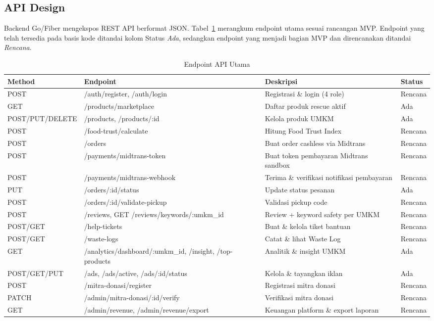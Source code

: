 \subsection{API Design}

Backend Go/Fiber mengekspos REST API berformat JSON. Tabel~\ref{tab:api} merangkum endpoint utama
sesuai rancangan MVP. Endpoint yang telah tersedia pada basis kode ditandai kolom Status
\emph{Ada}, sedangkan endpoint yang menjadi bagian MVP dan direncanakan ditandai \emph{Rencana}.

\begin{table}[htbp]
\centering
\caption{Endpoint API Utama}
\label{tab:api}
\small
\begin{tabularx}{\textwidth}{|l|>{\RaggedRight\arraybackslash}p{}|X|l|}
\hline
\textbf{Method} & \textbf{Endpoint} & \textbf{Deskripsi} & \textbf{Status} \\
\hline
POST & /auth/register, /auth/login & Registrasi \& login (4 role) & Rencana \\
\hline
GET & /products/marketplace & Daftar produk rescue aktif & Ada \\
\hline
POST/PUT/DELETE & /products, /products/:id & Kelola produk UMKM & Ada \\
\hline
POST & /food-trust/calculate & Hitung Food Trust Index & Rencana \\
\hline
POST & /orders & Buat order cashless via Midtrans & Rencana \\
\hline
POST & /payments/midtrans-token & Buat token pembayaran Midtrans sandbox & Rencana \\
\hline
POST & /payments/midtrans-webhook & Terima \& verifikasi notifikasi pembayaran & Rencana \\
\hline
PUT & /orders/:id/status & Update status pesanan & Ada \\
\hline
POST & /orders/:id/validate-pickup & Validasi pickup code & Rencana \\
\hline
POST & /reviews, GET /reviews/keywords/:umkm\_id & Review + keyword safety per UMKM & Rencana \\
\hline
POST/GET & /help-tickets & Buat \& kelola tiket bantuan & Rencana \\
\hline
POST/GET & /waste-logs & Catat \& lihat Waste Log & Rencana \\
\hline
GET & /analytics/dashboard/:umkm\_id, /insight, /top-products & Analitik \& insight UMKM & Ada \\
\hline
POST/GET/PUT & /ads, /ads/active, /ads/:id/status & Kelola \& tayangkan iklan & Ada \\
\hline
POST & /mitra-donasi/register & Registrasi mitra donasi & Rencana \\
\hline
PATCH & /admin/mitra-donasi/:id/verify & Verifikasi mitra donasi & Rencana \\
\hline
GET & /admin/revenue, /admin/revenue/export & Keuangan platform \& export laporan & Rencana \\
\hline
\end{tabularx}
\end{table}

